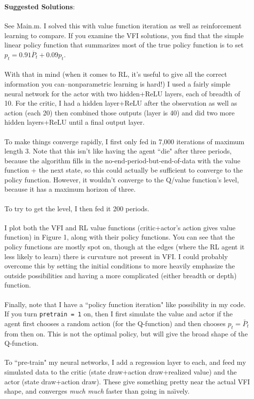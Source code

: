 \documentclass[11pt]{article}
\begin{document}
 \textbf{Suggested Solutions}:\\
 \ \\
 See Main.m.  I solved this with value function iteration as well as reinforcement learning to compare.  If you examine the VFI solutions, you find that the simple linear policy function that summarizes most of the true policy function is to set $p_t=0.91 \overline{P}_t+0.09 p_t$.  \\
 \ \\
With that in mind (when it comes to RL, it's useful to give all the correct information you can--nonparametric learning is hard!) I used a fairly simple neural network for the actor with two hidden+ReLU layers, each of breadth of 10. For the critic, I had a hidden layer+ReLU after the observation as well as action (each 20) then combined those outputs (layer is 40) and did two more hidden layers+ReLU until a final output layer.\\
\ \\
To make things converge rapidly, I first only fed in 7,000 iterations of maximum length 3.  Note that this isn't like having the agent ``die" after three periods, because the algorithm fills in the no-end-period-but-end-of-data with the value function + the next state, so this could actually be sufficient to converge to the policy function.  However, it wouldn't converge to the Q/value function's level, because it has a maximum horizon of three.\\
\ \\
To try to get the level, I then fed it 200 periods.\\
\ \\
I plot both the VFI and RL value functions (critic+actor's action gives value function) in Figure 1, along with their policy functions.  You can see that the policy functions are mostly spot on, though at the edges (where the RL agent it less likely to learn) there is curvature not present in VFI.  I could probably overcome this by setting the initial conditions to more heavily emphasize the outside possibilities and having a more complicated (either breadth or depth) function.\\
\ \\
Finally, note that I have a ``policy function iteration" like possibility in my code.  If you turn \texttt{pretrain = 1} on, then I first simulate the value and actor if the agent first chooses a random action (for the Q-function) and then chooses $p_t=\bar{P}_t$ from then on.  This is not the optimal policy, but will give the broad shape of the Q-function.\\
\ \\
To ``pre-train" my neural networks, I add a regression layer to each, and feed my simulated data to the critic (state draw+action draw+realized value) and the actor (state draw+action draw).  These give something pretty near the actual VFI shape, and converges \emph{much much} faster than going in na\"{\i}vely.  
\end{document}

